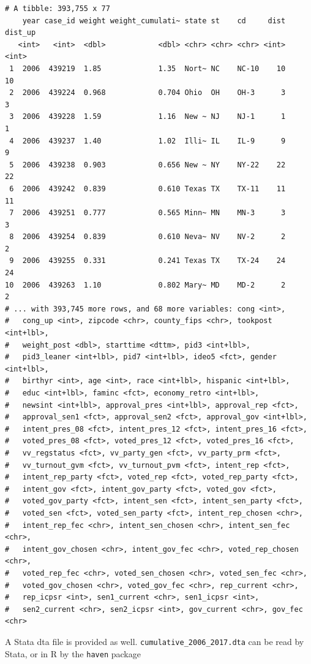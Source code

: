\documentclass[10pt,article,oneside]{memoir}
\theoremstyle{definition}
\begin{document}
\begin{verbatim}
# A tibble: 393,755 x 77
    year case_id weight weight_cumulati~ state st    cd     dist dist_up
   <int>   <int>  <dbl>            <dbl> <chr> <chr> <chr> <int>   <int>
 1  2006  439219  1.85             1.35  Nort~ NC    NC-10    10      10
 2  2006  439224  0.968            0.704 Ohio  OH    OH-3      3       3
 3  2006  439228  1.59             1.16  New ~ NJ    NJ-1      1       1
 4  2006  439237  1.40             1.02  Illi~ IL    IL-9      9       9
 5  2006  439238  0.903            0.656 New ~ NY    NY-22    22      22
 6  2006  439242  0.839            0.610 Texas TX    TX-11    11      11
 7  2006  439251  0.777            0.565 Minn~ MN    MN-3      3       3
 8  2006  439254  0.839            0.610 Neva~ NV    NV-2      2       2
 9  2006  439255  0.331            0.241 Texas TX    TX-24    24      24
10  2006  439263  1.10             0.802 Mary~ MD    MD-2      2       2
# ... with 393,745 more rows, and 68 more variables: cong <int>,
#   cong_up <int>, zipcode <chr>, county_fips <chr>, tookpost <int+lbl>,
#   weight_post <dbl>, starttime <dttm>, pid3 <int+lbl>,
#   pid3_leaner <int+lbl>, pid7 <int+lbl>, ideo5 <fct>, gender <int+lbl>,
#   birthyr <int>, age <int>, race <int+lbl>, hispanic <int+lbl>,
#   educ <int+lbl>, faminc <fct>, economy_retro <int+lbl>,
#   newsint <int+lbl>, approval_pres <int+lbl>, approval_rep <fct>,
#   approval_sen1 <fct>, approval_sen2 <fct>, approval_gov <int+lbl>,
#   intent_pres_08 <fct>, intent_pres_12 <fct>, intent_pres_16 <fct>,
#   voted_pres_08 <fct>, voted_pres_12 <fct>, voted_pres_16 <fct>,
#   vv_regstatus <fct>, vv_party_gen <fct>, vv_party_prm <fct>,
#   vv_turnout_gvm <fct>, vv_turnout_pvm <fct>, intent_rep <fct>,
#   intent_rep_party <fct>, voted_rep <fct>, voted_rep_party <fct>,
#   intent_gov <fct>, intent_gov_party <fct>, voted_gov <fct>,
#   voted_gov_party <fct>, intent_sen <fct>, intent_sen_party <fct>,
#   voted_sen <fct>, voted_sen_party <fct>, intent_rep_chosen <chr>,
#   intent_rep_fec <chr>, intent_sen_chosen <chr>, intent_sen_fec <chr>,
#   intent_gov_chosen <chr>, intent_gov_fec <chr>, voted_rep_chosen <chr>,
#   voted_rep_fec <chr>, voted_sen_chosen <chr>, voted_sen_fec <chr>,
#   voted_gov_chosen <chr>, voted_gov_fec <chr>, rep_current <chr>,
#   rep_icpsr <int>, sen1_current <chr>, sen1_icpsr <int>,
#   sen2_current <chr>, sen2_icpsr <int>, gov_current <chr>, gov_fec <chr>
\end{verbatim}

A Stata dta file is provided as well.
\texttt{cumulative\_2006\_2017.dta} can be read by Stata, or in R by the
\texttt{haven} package
\end{document}
